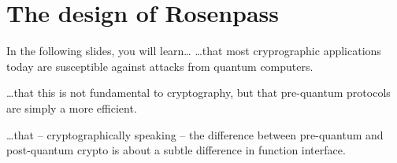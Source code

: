 \hypertarget{rosenpass}{
  \section{The design of Rosenpass}\label{rosenpass}
}



\begin{frame}{In the following slides, you will learn…}
\hypertarget{you-will-lean-post-quantum}{}
  …that most cryprographic applications today are susceptible against attacks from quantum computers.

  \vspace{2em}
  …that this is not fundamental to cryptography, but that pre-quantum protocols are simply a more efficient.

  \vspace{2em}
  …that – cryptographically speaking – the difference between pre-quantum and post-quantum crypto is about a subtle
  difference in function interface.
\end{frame}




